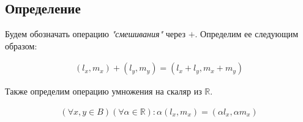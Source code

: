 \subsection*{Определение}
Будем обозначать операцию \textit{"смешивания"} через $+$. Определим ее следующим образом:

\begin{align}
  (l_x, m_x) + (l_y,m_y) = (l_x + l_y, m_x + m_y)
  \label{plus_def}
\end{align}

Также определим операцию умножения на скаляр из $\mathbb{R}$.

\begin{align}
  (\forall x,y \in B)(\forall \alpha \in \mathbb{R}):
  \alpha(l_x, m_x) = (\alpha l_x, \alpha m_x)
  \label{multiply_def}
\end{align}
